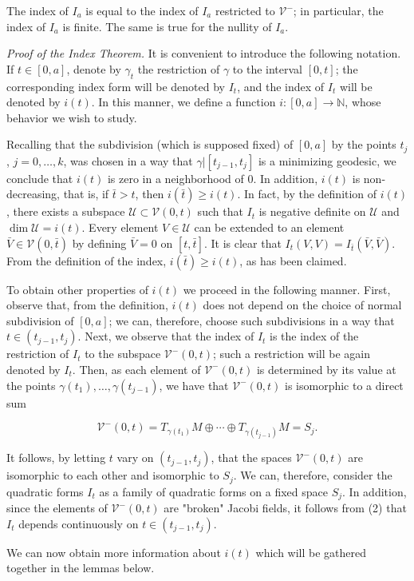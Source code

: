\begin{corollary}
  \label{cor:dc-ch11-2-6}
  The index of $I_a$ is equal to the index of $I_a$ restricted to
  $\mathcal{V}^-$; in particular, the index of $I_a$ is finite. The same is true
  for the nullity of $I_a$.
  
  \emph{Proof of the Index Theorem.} It is convenient to introduce the following
  notation. If $t\in[0,a]$, denote by $\gamma_t$ the restriction of $\gamma$ to the
  interval $[0,t]$; the corresponding index form will be denoted by $I_t$, and the
  index of $I_t$ will be denoted by $i(t)$. In this manner, we define a function
  $i:[0,a]\to\mathbb{N}$, whose behavior we wish to study.
  
  Recalling that the subdivision (which is supposed fixed) of $[0,a]$ by the points
  $t_j$, $j=0,\dots,k$, was chosen in a way that $\gamma|[t_{j-1},t_j]$ is a
  minimizing geodesic, we conclude that $i(t)$ is zero in a neighborhood of $0$. In
  addition, $i(t)$ is non-decreasing, that is, if $\bar t>t$, then
  $i(\bar t)\geq i(t)$. In fact, by the definition of $i(t)$, there exists a
  subspace $\mathcal{U}\subset\mathcal{V}(0,t)$ such that $I_t$ is negative
  definite on $\mathcal{U}$ and $\dim\mathcal{U}=i(t)$. Every element
  $V\in\mathcal{U}$ can be extended to an element $\bar V\in\mathcal{V}(0,\bar t)$
  by defining $\bar V=0$ on $[t,\bar t]$. It is clear that
  $I_t(V,V)=I_{\bar t}(\bar V,\bar V)$. From the definition of the index,
  $i(\bar t)\geq i(t)$, as has been claimed.
  
  To obtain other properties of $i(t)$ we proceed in the following manner. First,
  observe that, from the definition, $i(t)$ does not depend on the choice of normal
  subdivision of $[0,a]$; we can, therefore, choose such subdivisions in a way that
  $t\in(t_{j-1},t_j)$. Next, we observe that the index of $I_t$ is the index of the
  restriction of $I_t$ to the subspace $\mathcal{V}^-(0,t)$; such a restriction
  will be again denoted by $I_t$. Then, as each element of $\mathcal{V}^-(0,t)$ is
  determined by its value at the points $\gamma(t_1),\dots,\gamma(t_{j-1})$, we have
  that $\mathcal{V}^-(0,t)$ is isomorphic to a direct sum
  
  $$
  \mathcal{V}^-(0,t)=T_{\gamma(t_1)}M\oplus\cdots\oplus T_{\gamma(t_{j-1})}M=S_j.
  $$
  
  It follows, by letting $t$ vary on $(t_{j-1},t_j)$, that the spaces
  $\mathcal{V}^-(0,t)$ are isomorphic to each other and isomorphic to $S_j$. We
  can, therefore, consider the quadratic forms $I_t$ as a family of quadratic forms
  on a fixed space $S_j$. In addition, since the elements of $\mathcal{V}^-(0,t)$
  are "broken" Jacobi fields, it follows from (2) that $I_t$ depends continuously
  on $t\in(t_{j-1},t_j)$.
  
  We can now obtain more information about $i(t)$ which will be gathered together
  in the lemmas below.
\end{corollary}

